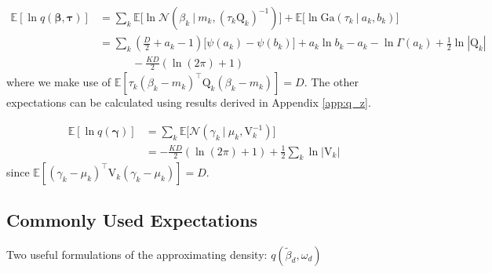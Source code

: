 \documentclass[twoside,11pt]{article}
\newcommand\given[1][]{\:#1\vert\:}
\newcommand{\transpose}[1]{#1^{\intercal}}
\newcommand{\ksum}{\sum\limits_{k}}
\newcommand{\boldbeta}{\boldsymbol\beta}
\newcommand{\boldgamma}{\boldsymbol\gamma}
\newcommand{\boldtau}{\boldsymbol\tau}
\newcommand{\E}{\mathbb{E}}
\newcommand{\betad}{\tilde{\beta}_d}
\begin{document}
\begin{equation} \label{eq:e6_deriv} %
\begin{split}
	\E[\ln q(\boldbeta, \boldtau)] &= \ksum \E \Big[ \ln \mathcal{N} \left( \beta_k \given m_k, (\tau_k \mathrm{Q}_k)^{-1}\right)\Big] + \E\Big[\ln \mathrm{Ga} \left( \tau_k \given a_k, b_k \right)\Big] \\
	&= \ksum \left( \frac{D}{2} + a_k - 1 \right) \big[\psi(a_k) - \psi(b_k) \big] + a_k \ln b_k - a_k - \ln \Gamma(a_k) + \frac{1}{2}\ln |\mathrm{Q}_{k}|\\
	& \quad \quad \quad -\frac{KD}{2} \left(  \ln(2\pi)  + 1\right)
\end{split}
\end{equation}
where we make use of $\E[\tau_k \transpose{(\beta_k - m_k)}\mathrm{Q}_k(\beta_k - m_k)] = D$. The other expectations can be calculated using results derived in Appendix \ref{app:q_z}.

\begin{equation} \label{eq:e7_deriv}
\begin{split}
	\E[\ln q(\boldgamma)] &= \ksum \E \Big[ \mathcal{N} \left( \gamma_k \given \mu_k, \mathrm{V}_{k}^{-1} \right)\Big] \\
	&= - \frac{KD}{2}(\ln (2\pi) + 1) + \frac{1}{2}\sum_{k} \ln|\mathrm{V}_k| 
\end{split}
\end{equation}
since $\E[\transpose{(\gamma_k - \mu_k)}\mathrm{V}_{k}(\gamma_k - \mu_k)] = D$.


\newpage


\begin{figure}
  \centering
\end{figure}

\subsection{Commonly Used Expectations}

Two useful formulations of the approximating density: $q \left( \betad, \omega_d \right)$
\end{document}
